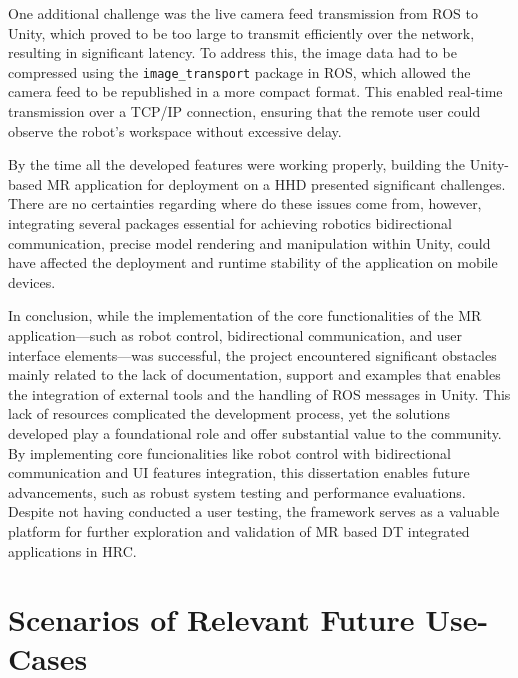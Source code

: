 One additional challenge was the live camera feed transmission from \ac{ROS} to Unity, which proved to be too large to transmit efficiently over the network, resulting in significant latency. To address this, the image data had to be compressed using the \texttt{image\_transport} package in \ac{ROS}, which allowed the camera feed to be republished in a more compact format. This enabled real-time transmission over a \ac{TCP}/\ac{IP} connection, ensuring that the remote user could observe the robot’s workspace without excessive delay.

By the time all the developed features were working properly, building the Unity-based \ac{MR} application for deployment on a \ac{HHD} presented significant challenges. There are no certainties regarding where do these issues come from, however, integrating several packages essential for achieving robotics bidirectional communication, precise model rendering and manipulation within Unity, could have affected the deployment and runtime stability of the application on mobile devices.

In conclusion, while the implementation of the core functionalities of the \ac{MR} application—such as robot control, bidirectional communication, and user interface elements—was successful, the project encountered significant obstacles mainly related to the lack of documentation, support and examples that enables the integration of external tools and the handling of \ac{ROS} messages in Unity. This lack of resources complicated the development process, yet the solutions developed play a foundational role and offer substantial value to the community. By implementing core funcionalities like robot control with bidirectional communication and \ac{UI} features integration, this dissertation enables future advancements, such as robust system testing and performance evaluations. Despite not having conducted a user testing, the framework serves as a valuable platform for further exploration and validation of \ac{MR} based \ac{DT} integrated applications in \ac{HRC}.



\section{Scenarios of Relevant Future Use-Cases}

